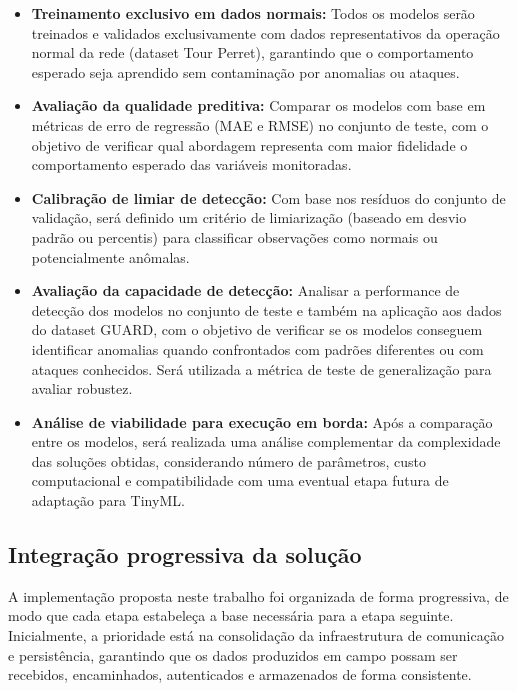 \begin{itemize}
    \item \textbf{Treinamento exclusivo em dados normais:} Todos os modelos serão treinados e validados exclusivamente com dados representativos da operação normal da rede (dataset Tour Perret), garantindo que o comportamento esperado seja aprendido sem contaminação por anomalias ou ataques.

    \item \textbf{Avaliação da qualidade preditiva:} Comparar os modelos com base em métricas de erro de regressão (MAE e RMSE) no conjunto de teste, com o objetivo de verificar qual abordagem representa com maior fidelidade o comportamento esperado das variáveis monitoradas.

    \item \textbf{Calibração de limiar de detecção:} Com base nos resíduos do conjunto de validação, será definido um critério de limiarização (baseado em desvio padrão ou percentis) para classificar observações como normais ou potencialmente anômalas.

    \item \textbf{Avaliação da capacidade de detecção:} Analisar a performance de detecção dos modelos no conjunto de teste e também na aplicação aos dados do dataset GUARD, com o objetivo de verificar se os modelos conseguem identificar anomalias quando confrontados com padrões diferentes ou com ataques conhecidos. Será utilizada a métrica de teste de generalização para avaliar robustez.

    \item \textbf{Análise de viabilidade para execução em borda:} Após a comparação entre os modelos, será realizada uma análise complementar da complexidade das soluções obtidas, considerando número de parâmetros, custo computacional e compatibilidade com uma eventual etapa futura de adaptação para TinyML.
\end{itemize}


\subsection{Integração progressiva da solução}

A implementação proposta neste trabalho foi organizada de forma progressiva, de modo que cada etapa estabeleça a base necessária para a etapa seguinte. Inicialmente, a prioridade está na consolidação da infraestrutura de comunicação e persistência, garantindo que os dados produzidos em campo possam ser recebidos, encaminhados, autenticados e armazenados de forma consistente.

